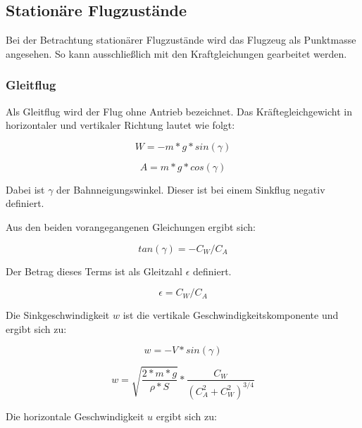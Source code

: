
\subsection{Stationäre Flugzustände}
\label{stationär}

Bei der Betrachtung stationärer Flugzustände wird das Flugzeug als Punktmasse angesehen. So kann ausschließlich mit den Kraftgleichungen gearbeitet werden.

\subsubsection{Gleitflug}
\label{gleitflug}

Als Gleitflug wird der Flug ohne Antrieb bezeichnet.
Das Kräftegleichgewicht in horizontaler und vertikaler Richtung lautet wie folgt:

\begin{equation}
W = -m * g * sin(\gamma)
\end{equation}

\begin{equation}
A = m * g * cos(\gamma)
\end{equation}

Dabei ist $\gamma$ der Bahnneigungswinkel. Dieser ist bei einem Sinkflug negativ definiert.

Aus den beiden vorangegangenen Gleichungen ergibt sich:

\begin{equation}
tan(\gamma) = -C_W/C_A
\end{equation}

Der Betrag dieses Terms ist als Gleitzahl $\epsilon$ definiert.

\begin{equation}
\epsilon = C_W/C_A
\end{equation}

Die Sinkgeschwindigkeit $w$ ist die vertikale Geschwindigkeitskomponente und ergibt sich zu:

\begin{equation}
w = -V * sin(\gamma)
\end{equation}

\begin{equation}
w = \sqrt{{\frac{2 * m * g}{\rho * S}}} * \frac{C_W}{(C^2_A + C^2_W)^{3/4}}
\end{equation}

Die horizontale Geschwindigkeit $u$ ergibt sich zu:

